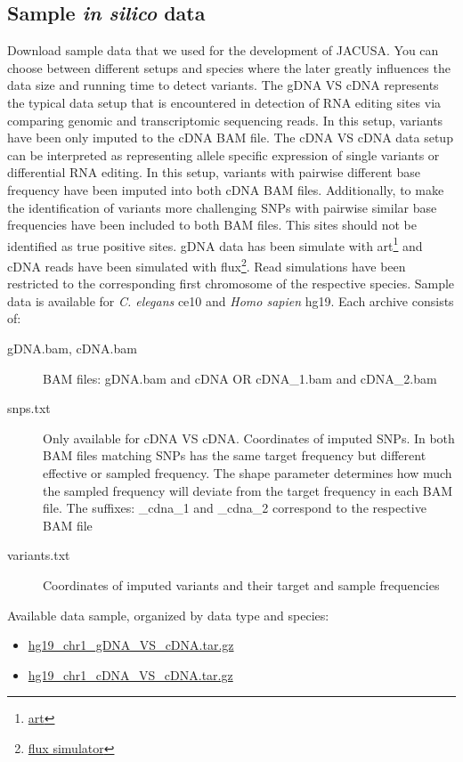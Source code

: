 \documentclass[10pt, a4paper]{article}
\begin{document}
\subsection{Sample \textit{in silico} data}
Download sample data that we used for the development of JACUSA. You can choose between different
setups and species where the later greatly influences the data size and running time to detect
variants. The gDNA VS cDNA represents the typical data setup that is encountered in detection of RNA
editing sites via comparing genomic and transcriptomic sequencing reads. In this setup, variants
have been only imputed to the cDNA BAM file. The cDNA VS cDNA data setup can be interpreted as
representing allele specific expression of single variants or differential RNA editing. In this
setup, variants with pairwise different base frequency have been imputed into both cDNA BAM files.
Additionally, to make the identification of variants more challenging SNPs with pairwise similar base
frequencies have been included to both BAM files. This sites should not be identified as true
positive sites.
gDNA data has been simulate with
art\footnote{\href{http://www.niehs.nih.gov/research/resources/software/biostatistics/art/}{art}}
and cDNA reads have been simulated with
flux\footnote{\href{http://sammeth.net/confluence/display/SIM/Home}{flux simulator}}. Read
simulations have been restricted to the corresponding first chromosome of the respective species.
Sample data is available for \textit{C. elegans} ce10 and \textit{Homo sapien} hg19. Each archive
consists of:
\begin{description}
  \item[gDNA.bam, cDNA.bam] BAM files: gDNA.bam and cDNA OR cDNA\_1.bam and cDNA\_2.bam
  \item[snps.txt] Only available for cDNA VS cDNA. Coordinates of imputed SNPs. In both
  BAM files matching SNPs has the same target frequency but different effective or sampled
  frequency. The shape parameter determines how much the sampled frequency will deviate from the
  target frequency in each BAM file. The suffixes: \_cdna\_1 and \_cdna\_2 correspond to the
  respective BAM file
  \item[variants.txt] Coordinates of imputed variants and their target and sample
  frequencies
\end{description}
Available data sample, organized by data type and species:
\begin{itemize}
  \item
  \href{http://www.age.mpg.com/software/jacusa/sample_data/hg19_chr1_gDNA_VS_cDNA.tar.gz}{hg19\_chr1\_gDNA\_VS\_cDNA.tar.gz}
  \item
  \href{http://www.age.mpg.com/software/jacusa/sample_data/hg19_chr1_cDNA_VS_cDNA.tar.gz}{hg19\_chr1\_cDNA\_VS\_cDNA.tar.gz}
\end{itemize}
\end{document}
